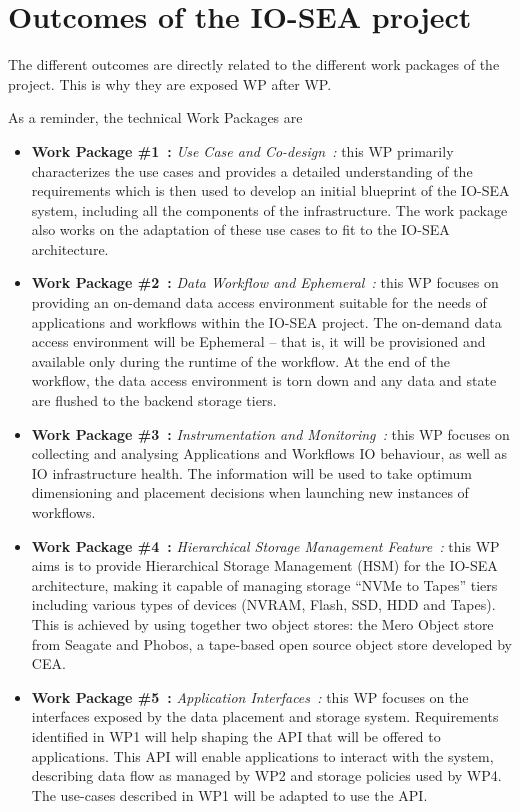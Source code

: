\chapter{Outcomes of the IO-SEA project}

The different outcomes are directly related to the different work packages of the project. This is why they are
exposed WP after WP.

As a reminder, the technical Work Packages are
\begin{itemize}
    \item \textbf{Work Package \#1~:} \textit{Use Case and Co-design~:} this WP primarily characterizes the use
    cases and provides a detailed understanding of the requirements which is then used to develop an initial
    blueprint of the IO-SEA system, including all the components of the infrastructure. The work package also
    works on the adaptation of these use cases to fit to the IO-SEA architecture.
    
    \item \textbf{Work Package \#2~:} \textit{Data Workflow and Ephemeral~:} this WP focuses on providing an
    on-demand data access environment suitable for the needs of applications and workflows within the IO-SEA
    project. The on-demand data access environment will be Ephemeral – that is, it will be provisioned and
    available only during the runtime of the workflow. At the end of the workflow, the data access environment is
    torn down and any data and state are flushed to the backend storage tiers.
    
    \item \textbf{Work Package \#3~:} \textit{Instrumentation and Monitoring~:} this WP focuses on collecting and
    analysing Applications and Workflows IO behaviour, as well as IO infrastructure health. The information will
    be used to take optimum dimensioning and placement decisions when launching new instances of workflows.
    
    \item \textbf{Work Package \#4~:} \textit{Hierarchical Storage Management Feature~:} this WP aims is to
    provide Hierarchical Storage Management (HSM) for the IO-SEA architecture, making it capable of managing
    storage “NVMe to Tapes” tiers including various types of devices (NVRAM, Flash, SSD, HDD and Tapes). This is
    achieved by using together two object stores: the Mero Object store from Seagate and Phobos, a tape-based open
    source object store developed by CEA. 
    
    \item \textbf{Work Package \#5~:} \textit{Application Interfaces~:} this WP focuses on the interfaces exposed
    by the data placement and storage system. Requirements identified in WP1 will help shaping the API that will
    be offered to applications. This API will enable applications to interact with the system, describing data
    flow as managed by WP2 and storage policies used by WP4. The use-cases described in WP1 will be adapted to 
    use the API.
\end{itemize}

